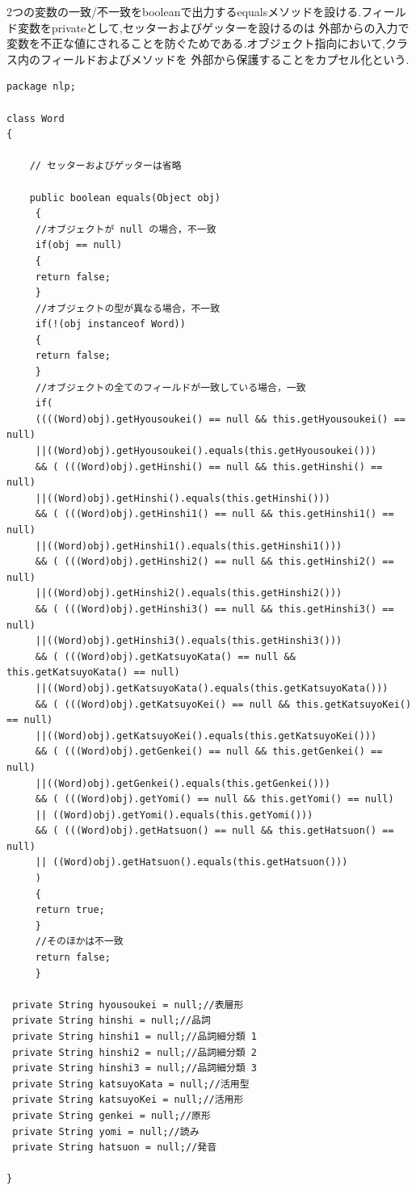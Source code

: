 \documentclass[a4j]{jarticle}
\begin{document}
  2つの変数の一致/不一致をbooleanで出力するequalsメソッドを設ける.フィールド変数をprivateとして,セッターおよびゲッターを設けるのは
  外部からの入力で変数を不正な値にされることを防ぐためである.オブジェクト指向において,クラス内のフィールドおよびメソッドを
  外部から保護することをカプセル化という.
  \begin{lstlisting}[basicstyle=\ttfamily\footnotesize, frame=single,label=WordClass,caption=Wordクラスのソースコード]
package nlp;

class Word
{

	// セッターおよびゲッターは省略

	public boolean equals(Object obj)
	 {
	 //オブジェクトが null の場合，不一致
	 if(obj == null)
	 {
	 return false;
	 }
	 //オブジェクトの型が異なる場合，不一致
	 if(!(obj instanceof Word))
	 {
	 return false;
	 }
	 //オブジェクトの全てのフィールドが一致している場合，一致
	 if(
	 ((((Word)obj).getHyousoukei() == null && this.getHyousoukei() == null)
	 ||((Word)obj).getHyousoukei().equals(this.getHyousoukei()))
	 && ( (((Word)obj).getHinshi() == null && this.getHinshi() == null)
	 ||((Word)obj).getHinshi().equals(this.getHinshi()))
	 && ( (((Word)obj).getHinshi1() == null && this.getHinshi1() == null)
	 ||((Word)obj).getHinshi1().equals(this.getHinshi1()))
	 && ( (((Word)obj).getHinshi2() == null && this.getHinshi2() == null)
	 ||((Word)obj).getHinshi2().equals(this.getHinshi2()))
	 && ( (((Word)obj).getHinshi3() == null && this.getHinshi3() == null)
	 ||((Word)obj).getHinshi3().equals(this.getHinshi3()))
	 && ( (((Word)obj).getKatsuyoKata() == null && this.getKatsuyoKata() == null)
	 ||((Word)obj).getKatsuyoKata().equals(this.getKatsuyoKata()))
	 && ( (((Word)obj).getKatsuyoKei() == null && this.getKatsuyoKei() == null)
	 ||((Word)obj).getKatsuyoKei().equals(this.getKatsuyoKei()))
	 && ( (((Word)obj).getGenkei() == null && this.getGenkei() == null)
	 ||((Word)obj).getGenkei().equals(this.getGenkei()))
	 && ( (((Word)obj).getYomi() == null && this.getYomi() == null)
	 || ((Word)obj).getYomi().equals(this.getYomi()))
	 && ( (((Word)obj).getHatsuon() == null && this.getHatsuon() == null)
	 || ((Word)obj).getHatsuon().equals(this.getHatsuon()))
	 )
	 {
	 return true;
	 }
	 //そのほかは不一致
	 return false;
	 }

 private String hyousoukei = null;//表層形
 private String hinshi = null;//品詞
 private String hinshi1 = null;//品詞細分類 1
 private String hinshi2 = null;//品詞細分類 2
 private String hinshi3 = null;//品詞細分類 3
 private String katsuyoKata = null;//活用型
 private String katsuyoKei = null;//活用形
 private String genkei = null;//原形
 private String yomi = null;//読み
 private String hatsuon = null;//発音

}
    \end{lstlisting}
    
\end{document}
